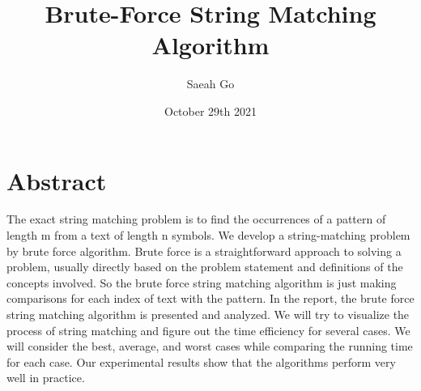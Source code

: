 \documentclass{article}
\title{\textbf{Brute-Force String Matching Algorithm}}
\author{Saeah Go}
\date{October 29th 2021}
\begin{document}
\maketitle

\section{\textbf{Abstract}}
\indent \indent The exact string matching problem is to find the occurrences of a pattern of length m from a text of length n symbols. We develop a string-matching problem by brute force algorithm. Brute force is a straightforward approach to solving a problem, usually directly based on the problem statement and definitions of the concepts involved. So the brute force string matching algorithm is just making comparisons for each index of text with the pattern. In the report, the brute force string matching algorithm is presented and analyzed. We will try to visualize the process of string matching and figure out the time efficiency for several cases. We will consider the best, average, and worst cases while comparing the running time for each case. Our experimental results show that the algorithms perform very well in practice. 
\end{document}
